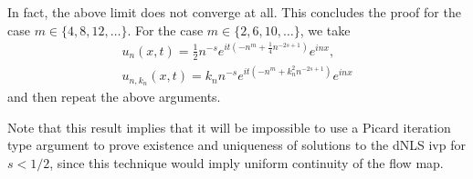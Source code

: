 %
In fact, the above limit does not converge at all. This concludes the proof for
the case $m \in \{4, 8, 12, \dots \}$. For the case $m \in \{2, 6, 10, \dots \}$, we take
%
%
\begin{equation*}
	\begin{split}
		u_{n}(x,t) = \frac{1}{2}n^{-s}e^{it\left( -n^{m} + \frac{1}{4}n^{-2s+1}
		\right)}e^{inx},
		\\ u_{n, k_{n}}(x,t) = k_{n}n^{-s}e^{it\left( -n^{m} + k_{n}^{2}n^{-2s+1}
		\right)}e^{inx} 
	\end{split}
\end{equation*}
and then repeat the above arguments. \qquad \qedsymbol
%
%
\begin{framed}
\begin{remark}
	Note that this result implies that it will be impossible to use a Picard
	iteration type argument to prove existence and uniqueness of solutions to the
	dNLS ivp for $s<1/2$, since this technique would imply uniform
	continuity of the flow map.
\end{remark}
\end{framed}
%
%

